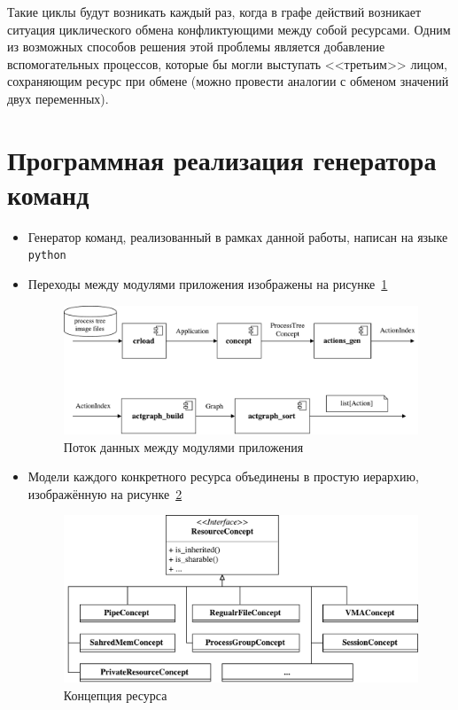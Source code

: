 Такие циклы будут возникать каждый раз, когда в графе действий возникает ситуация циклического обмена конфликтующими между собой ресурсами. Одним из возможных способов решения этой проблемы является добавление вспомогательных процессов,
которые бы могли выступать <<третьим>> лицом, сохраняющим ресурс при обмене (можно провести аналогии с обменом значений двух переменных).

\section{Программная реализация генератора команд}

\begin{itemize}
	\item Генератор команд, реализованный в рамках данной работы, написан на языке \texttt{python}
	\item Переходы между модулями приложения изображены на рисунке~\ref{chap2:fig:flow}

\begin{figure}[ht!]
\centering
\includegraphics[scale=0.6]{fig/flow.pdf}
\caption{Поток данных между модулями приложения}
\label{chap2:fig:flow}
\end{figure}


	\item Модели каждого конкретного ресурса объединены в простую иерархию, изображённую на рисунке~\ref{chap2:fig:resourcesconcept}

\begin{figure}[ht!]
\centering
\includegraphics[scale=0.7]{fig/resourceConceptStruct.pdf}
\caption{Концепция ресурса}
\label{chap2:fig:resourcesconcept}
\end{figure}


\end{itemize}
